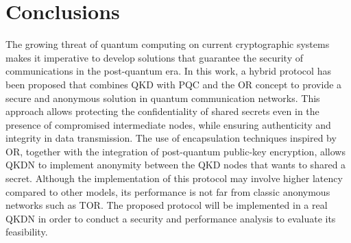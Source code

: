\documentclass[conference]{IEEEtran}
\begin{document}
\begin{comment}
  \begin{itemize}
    \item \textbf{Military private network}: In the military sector, communication is essential and they usually have highly secure private networks to communicate with strategic points such as military bases or surveillance points.

    \item \textbf{Bank communication network}: In the banking sector, data security is critical and it is common among large banking institutions to make sensitive communications between head offices and main branches with in a private network.

    \item \textbf{Communication of patient data between hospitals}: Personal health-related data is often considered to be particularly critical and sensitive information. In turn, hospitals need to share this information with each other for patient follow-up or disease studies in the most secure way, making this use case suit the proposed QSNS.
\end{itemize}  
\end{comment}

\section{Conclusions \label{sec:cons}}

The growing threat of quantum computing on current cryptographic systems makes it imperative to develop solutions that guarantee the security of communications in the post-quantum era. In this work, a hybrid protocol has been proposed that combines QKD with PQC and the OR concept to provide a secure and anonymous solution in quantum communication networks. This approach allows protecting the confidentiality of shared secrets even in the presence of compromised intermediate nodes, while ensuring authenticity and integrity in data transmission. The use of encapsulation techniques inspired by OR, together with the integration of post-quantum public-key encryption, allows QKDN to implement anonymity between the QKD nodes that wants to shared a secret. Although the implementation of this protocol may involve higher latency compared to other models, its performance is not far from classic anonymous networks such as TOR. The proposed protocol will be implemented in a real QKDN in order to conduct a security and performance analysis to evaluate its feasibility.
\end{document}
